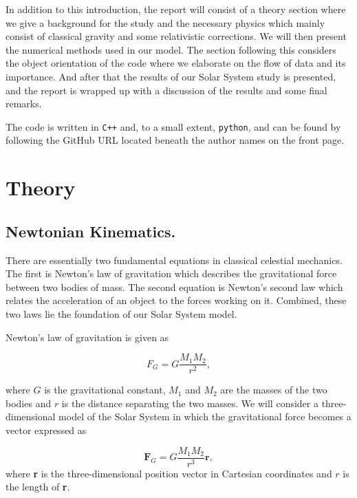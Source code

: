 \documentclass[a4paper, 10pt, reqno]{amsart}
\begin{document}
In addition to this introduction, the report will consist of a theory section where we give a background for the study and the necessary physics which mainly consist of classical gravity and some relativistic corrections. We will then present the numerical methods used in our model. The section following this considers the object orientation of the code where we elaborate on the flow of data and its importance. And after that the results of our Solar System study is presented, and the report is wrapped up with a discussion of the results and some final remarks.

The code is written in \texttt{C++} and, to a small extent, \texttt{python}, and can be found by following the GitHub URL located beneath the author names on the front page.


\section{Theory}\label{sec:theory}

\subsection{Newtonian Kinematics.}
There are essentially two fundamental equations in classical celestial mechanics. The first is Newton's law of gravitation which describes the gravitational force between two bodies of mass. The second equation is Newton's second law which relates the acceleration of an object to the forces working on it. Combined, these two laws lie the foundation of our Solar System model. 

Newton's law of gravitation is given as

\begin{equation}\label{eq:1}
    F_G = G \frac{M_1 M_2}{r^2},
\end{equation}

\noindent where $G$ is the gravitational constant, $M_1$ and $M_2$ are the masses of the two bodies and $r$ is the distance separating the two masses. We will consider a three-dimensional model of the Solar System in which the gravitational force becomes a vector expressed as

\begin{equation}\label{eq:2}
    \mathbf{F}_G = G \frac{M_1 M_2}{r^3}\mathbf{r},
\end{equation}
where \textbf{r} is the three-dimensional position vector in Cartesian coordinates and $r$ is the length of \textbf{r}.
\end{document}
